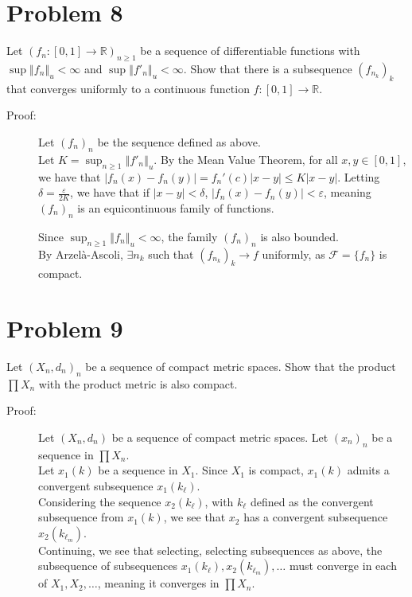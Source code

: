\documentclass[10pt]{extarticle}
\newcommand{\R}{\mathbb{R}}
\newcommand{\norm}[1]{\left\Vert #1\right\Vert}
\begin{document}
  \section{Problem 8}%
  Let $(f_n: [0,1]\rightarrow \R)_{n\geq 1}$ be a sequence of differentiable functions with $\sup\norm{f_n}_u < \infty$ and $\sup\norm{f'_n}_u < \infty$. Show that there is a subsequence $\left(f_{n_k}\right)_k$ that converges uniformly to a continuous function $f: [0,1]\rightarrow \R$.
  \begin{description}
    \item[Proof:] Let $(f_n)_n$ be the sequence defined as above.\\

      Let $K = \sup_{n\geq 1}\norm{f'_n}_u$. By the Mean Value Theorem, for all $x,y\in [0,1]$, we have that $|f_n(x)-f_n(y)| = f_n'(c)|x-y| \leq K|x-y|$. Letting $\delta = \frac{\varepsilon}{2K}$, we have that if $|x-y| < \delta$, $|f_n(x) - f_n(y)| < \varepsilon$, meaning $(f_n)_n$ is an equicontinuous family of functions.

      Since $\sup_{n\geq 1}\norm{f_n}_u < \infty$, the family $(f_n)_n$ is also bounded.\\

      By Arzelà-Ascoli, $\exists n_k$ such that $\left(f_{n_k}\right)_k \rightarrow f$ uniformly, as $\mathcal{F} = \{f_n\}$ is compact.
  \end{description}
  \section{Problem 9}%
  Let $(X_n,d_n)_n$ be a sequence of compact metric spaces. Show that the product $\prod X_n$ with the product metric is also compact.
  \begin{description}
    \item[Proof:] Let $(X_n,d_n)$ be a sequence of compact metric spaces. Let $(x_n)_n$ be a sequence in $\prod X_n$.\\

      Let $x_1(k)$ be a sequence in $X_1$. Since $X_1$ is compact, $x_1(k)$ admits a convergent subsequence $x_1\left(k_{\ell}\right)$.\\

      Considering the sequence $x_2\left(k_{\ell}\right)$, with $k_{\ell}$ defined as the convergent subsequence from $x_1(k)$, we see that $x_2$ has a convergent subsequence $x_2\left(k_{\ell_m}\right)$.\\

      Continuing, we see that selecting, selecting subsequences as above, the subsequence of subsequences $x_1\left(k_{\ell}\right), x_2\left(k_{\ell_m}\right),\dots$ must converge in each of $X_1,X_2,\dots$, meaning it converges in $\prod X_n$.
  \end{description}
\end{document}
